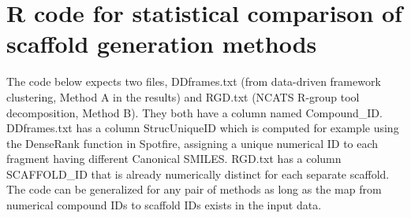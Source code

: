 \documentclass[11pt,letterpaper]{article}
\begin{document}
\newpage 

\section{R code for statistical comparison of scaffold generation methods}
\label{sec:statcode-scafcomp}

The code below expects two files, DDframes.txt (from data-driven framework clustering, Method A in the results) and RGD.txt (NCATS R-group tool decomposition, Method B). They both have a column named Compound\_ID. DDframes.txt has a column StrucUniqueID which is computed for example using the DenseRank function in Spotfire, assigning a unique numerical ID to each fragment having different Canonical SMILES.  RGD.txt has a column SCAFFOLD\_ID that is already numerically distinct for each separate scaffold. The code can be generalized for any pair of methods as long as the map from numerical compound IDs to scaffold IDs exists in the input data. 
\end{document}
